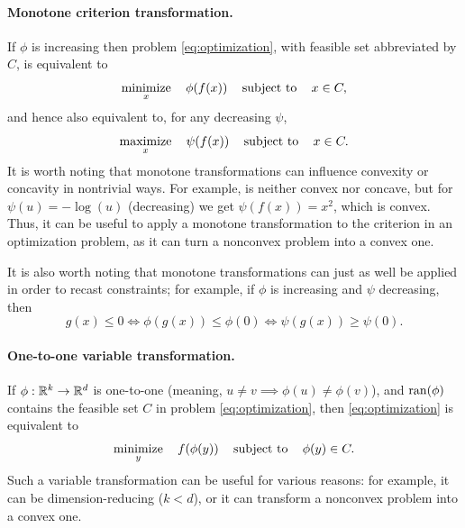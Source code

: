 \paragraph{Monotone criterion transformation.} 

If $\phi$ is increasing then problem \eqref{eq:optimization}, with feasible set
abbreviated by $C$, is equivalent to 
\[
\operatorname*{minimize}_x \quad \phi(f(x)) \quad \operatorname{subject\,\,to} \quad x \in C,
\]
and hence also equivalent to, for any decreasing $\psi$,
\[
\operatorname*{maximize}_x \quad \psi(f(x)) \quad \operatorname{subject\,\,to} \quad x \in C.
\]
It is worth noting that monotone transformations can influence convexity or
concavity in nontrivial ways. For example,  is neither
convex nor concave, but for $\psi(u) = -\log(u)$ (decreasing) we get $\psi(f(x))
= x^2$, which is convex. Thus, it can be useful to apply a monotone
transformation to the criterion in an optimization problem, as it can turn a
nonconvex problem into a convex one.  

It is also worth noting that monotone transformations can just as well be
applied in order to recast constraints; for example, if $\phi$ is increasing and
$\psi$ decreasing, then 
\[
g(x) \leq 0 \iff \phi(g(x)) \leq \phi(0) \iff \psi(g(x)) \geq \psi(0).
\]

\paragraph{One-to-one variable transformation.} 

If $\phi : \mathbb{R}^k \to \mathbb{R}^d$ is one-to-one (meaning, $u \not= v \implies \phi(u)
\not= \phi(v)$), and $\operatorname{ran}(\phi)$ contains the feasible set $C$ in problem
\eqref{eq:optimization}, then \eqref{eq:optimization} is equivalent to   
\[
\operatorname*{minimize}_y \quad f(\phi(y)) \quad \operatorname{subject\,\,to} \quad \phi(y) \in C. 
\]
Such a variable transformation can be useful for various reasons: for example,
it can be dimension-reducing ($k < d$), or it can transform a nonconvex problem
into a convex one.  

